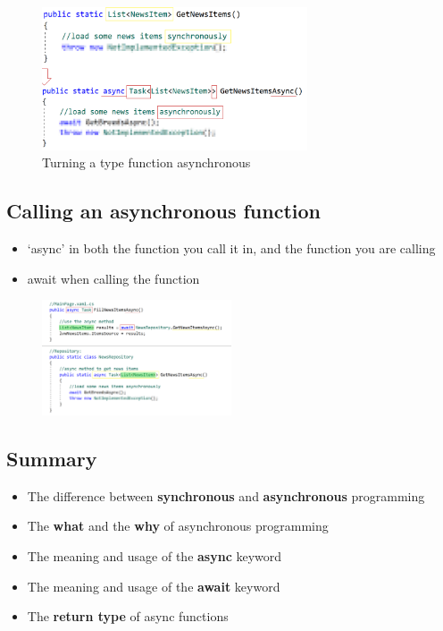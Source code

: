 \documentclass{article}
\newcommand{\bold}[1]{\textbf{#1}}
\begin{document}
\begin{figure}[H]
    \centering
    \includegraphics[width=0.7\textwidth]{async-type.png}
    \caption{Turning a type function asynchronous}
\end{figure}

\subsection{Calling an asynchronous function}

\begin{itemize}
    \item `async' in both the function you call it in, and the function you are calling
    \item await when calling the function
\end{itemize}

\begin{figure}[H]
    \centering
    \includegraphics[width=0.5\textwidth]{async-calling.png}
    \caption{}
\end{figure}

\subsection{Summary}
\begin{itemize}
    \item The difference between \bold{synchronous} and \bold{asynchronous} programming
    \item The \bold{what} and the \bold{why} of asynchronous programming
    \item The meaning and usage of the \bold{async} keyword
    \item The meaning and usage of the \bold{await} keyword
    \item The \bold{return type} of async functions
\end{itemize}
\end{document}
